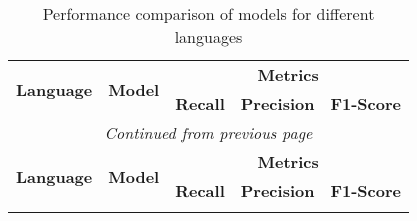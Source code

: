 
\onecolumn %
\begin{longtable}{p{4cm}p{6cm}ccc}
    \caption{Performance comparison of models for different languages} \label{tab:model_selection}                                                                                                 \\
    \toprule
    \multirow{2}{*}{\textbf{Language}}    & \multirow{2}{*}{\textbf{Model}}                                        & \multicolumn{3}{c}{\textbf{Metrics}}                                          \\
    \cmidrule(lr){3-5}
                                          &                                                                        & \textbf{Recall}                      & \textbf{Precision} & \textbf{F1-Score} \\
    \midrule
    \endfirsthead

    \multicolumn{5}{c}{\textit{Continued from previous page}}                                                                                                                                      \\
    \toprule
    \multirow{2}{*}{\textbf{Language}}    & \multirow{2}{*}{\textbf{Model}}                                        & \multicolumn{3}{c}{\textbf{Metrics}}                                          \\
    \cmidrule(lr){3-5}
                                          &                                                                        & \textbf{Recall}                      & \textbf{Precision} & \textbf{F1-Score} \\
    \midrule
    \endhead

    \endfoot

    \bottomrule
    \endlastfoot


\end{longtable}
